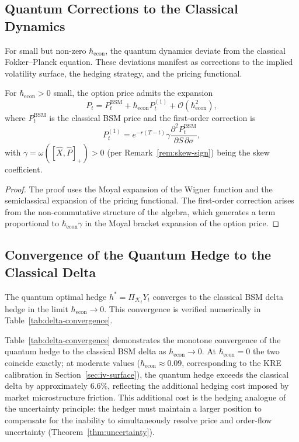 \subsection{Quantum Corrections to the Classical Dynamics}

For small but non-zero $\hbar_{\mathrm{econ}}$, the quantum dynamics deviate
from the classical Fokker--Planck equation. These deviations manifest as
corrections to the implied volatility surface, the hedging strategy, and the
pricing functional.

\begin{theorem}\label{thm:quantum-correction}
For $\hbar_{\mathrm{econ}} > 0$ small, the option price admits the expansion
\begin{equation*}
    P_t = P_t^{\mathrm{BSM}} + \hbar_{\mathrm{econ}} P_t^{(1)}
    + \mathcal{O}(\hbar_{\mathrm{econ}}^2),
\end{equation*}
where $P_t^{\mathrm{BSM}}$ is the classical BSM price and the first-order
correction is
\begin{equation*}
    P_t^{(1)} = e^{-r(T-t)} \gamma \frac{\partial^2 P_t^{\mathrm{BSM}}}
        {\partial S \, \partial \sigma},
\end{equation*}
with $\gamma = \omega([\hat{X}, \hat{P}]_+) > 0$ (per Remark~\ref{rem:skew-sign})
being the skew coefficient.
\end{theorem}

\begin{proof}
The proof uses the Moyal expansion of the Wigner function and the semiclassical
expansion of the pricing functional. The first-order correction arises from the
non-commutative structure of the algebra, which generates a term proportional to
$\hbar_{\mathrm{econ}} \gamma$ in the Moyal bracket expansion of the option
price.
\end{proof}

\subsection{Convergence of the Quantum Hedge to the Classical Delta}

The quantum optimal hedge $h^* = \Pi_{\mathcal{K}_t} Y_t$ converges to the
classical BSM delta hedge in the limit $\hbar_{\mathrm{econ}} \to 0$. This
convergence is verified numerically in Table~\ref{tab:delta-convergence}.



Table~\ref{tab:delta-convergence} demonstrates the monotone convergence of the
quantum hedge to the classical BSM delta as $\hbar_{\mathrm{econ}} \to 0$. At
$\hbar_{\mathrm{econ}} = 0$ the two coincide exactly; at moderate values
($\hbar_{\mathrm{econ}} \approx 0.09$, corresponding to the KRE calibration in
Section~\ref{sec:iv-surface}), the quantum hedge exceeds the classical delta by
approximately $6.6\%$, reflecting the additional hedging cost imposed by
market microstructure friction. This additional cost is the hedging analogue of
the uncertainty principle: the hedger must maintain a larger position to
compensate for the inability to simultaneously resolve price and order-flow
uncertainty (Theorem~\ref{thm:uncertainty}).

